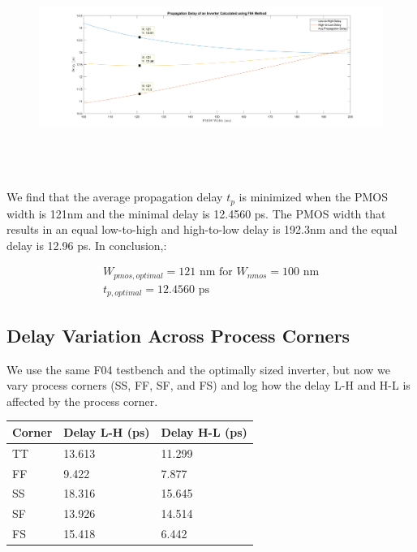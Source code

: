 \documentclass[11pt]{article}
\begin{document}
\begin{figure}[H]
	\centerline{\includegraphics[height=7cm]{images/inverter_delay.png}}
\end{figure}

We find that the average propagation delay $t_p$ is minimized when the PMOS width is 121nm and the minimal delay is 12.4560 ps. The PMOS width that results in an equal low-to-high and high-to-low delay is 192.3nm and the equal delay is 12.96 ps. In conclusion,:

\begin{eqnarray}
W_{pmos,optimal} = 121 \text{ nm for } W_{nmos} = 100 \text{ nm} \nonumber \\
t_{p,optimal} = 12.4560 \text{ ps} \nonumber
\end{eqnarray}

\subsection{Delay Variation Across Process Corners}
We use the same F04 testbench and the optimally sized inverter, but now we vary process corners (SS, FF, SF, and FS) and log how the delay L-H and H-L is affected by the process corner.

\begin{center}
\begin{tabular}{| l | l | l |} \hline
	Corner & Delay L-H (ps) & Delay H-L (ps) \\ \hline
	TT & 13.613 & 11.299 \\ \hline
	FF & 9.422 & 7.877 \\ \hline
	SS & 18.316 & 15.645 \\ \hline
	SF & 13.926 & 14.514 \\ \hline
	FS & 15.418 & 6.442\\ \hline
\end{tabular}
\end{center}
\end{document}
